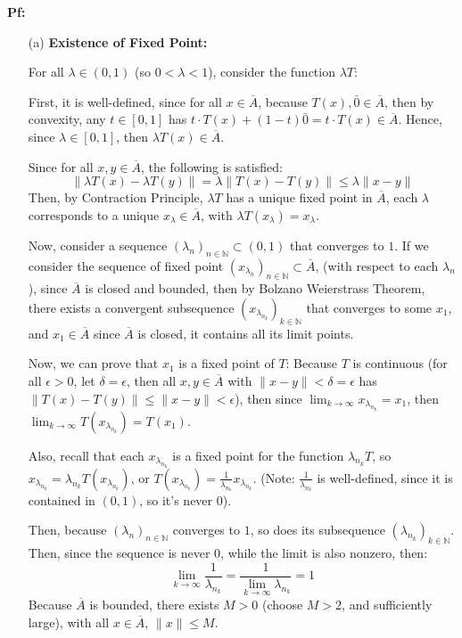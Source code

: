 \documentclass{article}
\begin{document}
\textbf{Pf:}

\begin{itemize}
    \item[(a)] \textbf{Existence of Fixed Point:}
    
    For all $\lambda\in (0,1)$ (so $0<\lambda<1$), consider the function $\lambda T$: 
    
    First, it is well-defined, since for all $x\in \overline{A}$, because $T(x),\bar{0}\in \overline{A}$,
    then by convexity, any $t\in [0,1]$ has $t\cdot T(x)+(1-t)\bar{0} = t\cdot T(x)\in \overline{A}$.
    Hence, since $\lambda \in [0,1]$, then $\lambda T(x)\in \overline{A}$.

    \hfil
    
    Since for all $x,y\in \overline{A}$, the following is satisfied:
    $$\|\lambda T(x)-\lambda T(y)\| = \lambda\|T(x)-T(y)\| \leq \lambda \|x-y\|$$
    Then, by Contraction Principle, $\lambda T$ has a unique fixed point in $\overline{A}$, each $\lambda$ corresponds to a unique $x_\lambda\in \overline{A}$, with $\lambda T(x_\lambda)=x_\lambda$.

    \hfil

    Now, consider a sequence $(\lambda_n)_{n\in\mathbb{N}}\subset (0,1)$ that converges to $1$. If we consider the sequence of fixed point $(x_{\lambda_n})_{n\in\mathbb{N}}\subset \overline{A}$,
    (with respect to each $\lambda_n$), since $\overline{A}$ is closed and bounded, then by Bolzano Weierstrass Theorem, 
    there exists a convergent subsequence $(x_{\lambda_{n_k}})_{k\in\mathbb{N}}$ that converges to some $x_1$, and $x_1\in\overline{A}$ since $\overline{A}$ is closed, it contains all its limit points.

    \hfil

    Now, we can prove that $x_1$ is a fixed point of $T$: Because $T$ is continuous (for all $\epsilon>0$, let $\delta=\epsilon$, then all $x,y\in \overline{A}$ with $\|x-y\|<\delta=\epsilon$ has $\|T(x)-T(y)\|\leq \|x-y\|<\epsilon$),
    then since $\lim_{k\rightarrow\infty}x_{\lambda_{n_k}}=x_1$, then $\lim_{k\rightarrow\infty}T(x_{\lambda_{n_k}})=T(x_1)$.

    Also, recall that each $x_{\lambda_{n_k}}$ is a fixed point for the function $\lambda_{n_k}T$, so $x_{\lambda_{n_k}}=\lambda_{n_k}T(x_{\lambda_{n_k}})$, or $T(x_{\lambda_{n_k}})=\frac{1}{\lambda_{n_k}}x_{\lambda_{n_k}}$.
    (Note: $\frac{1}{\lambda_{n_k}}$ is well-defined, since it is contained in $(0,1)$, so it's never $0$).

    Then, because $(\lambda_n)_{n\in\mathbb{N}}$ converges to $1$, so does its subsequence $(\lambda_{n_k})_{k\in\mathbb{N}}$. Then, since the sequence is never $0$, while the limit is also nonzero, then:
    $$\lim_{k\rightarrow\infty}\frac{1}{\lambda_{n_k}}=\frac{1}{\lim_{k\rightarrow\infty}\lambda_{n_k}} = 1$$
    Because $\overline{A}$ is bounded, there exists $M>0$ (choose $M>2$, and sufficiently large), with all $x\in\overline{A}$, $\|x\|\leq M$.
    

\end{itemize}
\end{document}
